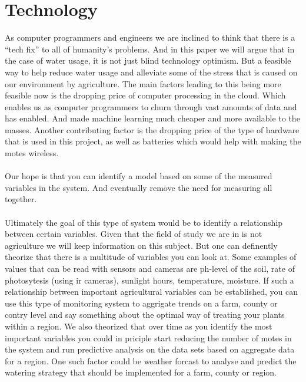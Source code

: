 \documentclass[]{uiophd}
\begin{document}
\section{Technology}
As computer programmers and engineers we are inclined to think that there is a “tech fix” to all of humanity's problems. And in this paper we will argue that in the case of water usage, it is not just blind technology optimism. But a feasible way to help reduce water usage and alleviate some of the stress that is caused on our environment by agriculture. The main factors leading to this being more feasible now is the dropping price of computer processing in the cloud. Which enables us as computer programmers to churn through vast amounts of data and has enabled. And made machine learning much cheaper and more available to the masses. Another contributing factor is the dropping price of the type of hardware that is used in this project, as well as batteries which would help with making the motes wireless.
\\\\
Our hope is that you can identify a model based on some of the measured variables in the system. And eventually remove the need for measuring all together. 
\\\\
Ultimately the goal of this type of system would be to identify a relationship between certain variables.  Given that the field of study we are in is not agriculture we will keep information on this subject. But one can definently theorize that there is a multitude of variables you can look at. Some examples of values that can be read with sensors and cameras are ph-level of the soil, rate of photosytesis (using ir cameras), sunlight hours, temperature, moisture. If such a relationship between important agricultural variables can be established, you can use this type of monitoring system to aggrigate trends on a farm, county or contry level and say something about the optimal way of treating your plants within a region. We also theorized that over time as you identify the most important variables you could in priciple start reducing the number of motes in the system and run predictive analysis on the data sets based on aggregate data for a region. One such factor could be weather forcast to analyse and predict the watering strategy that should be implemented for a farm, county or region. 
\end{document}

